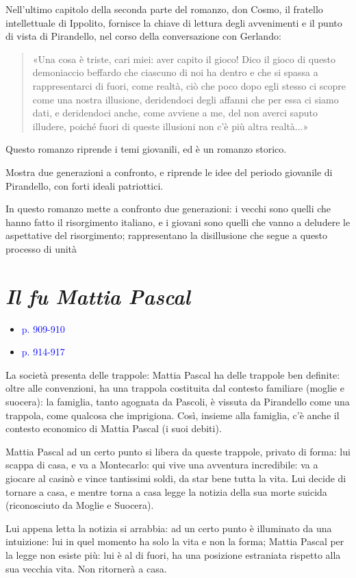 \documentclass[a4paper, twoside, titlepage]{book}
\newcommand{\elenco}[1]{%
\begin{itemize}
#1
\end{itemize}}
\newcommand{\citazione}[1]{%
  \begin{quotation}
  \noindent #1
  \end{quotation}}
\renewcommand{\emph}[1]{\textcolor{blue}{#1}}
\begin{document}
Nell'ultimo capitolo della seconda parte del romanzo, don Cosmo, il fratello intellettuale di Ippolito, fornisce la chiave di lettura degli avvenimenti e il punto di vista di Pirandello, nel corso della conversazione con Gerlando:

\citazione{«Una cosa è triste, cari miei: aver capito il gioco! Dico il gioco di questo demoniaccio beffardo che ciascuno di noi ha dentro e che si spassa a rappresentarci di fuori, come realtà, ciò che poco dopo egli stesso ci scopre come una nostra illusione, deridendoci degli affanni che per essa ci siamo dati, e deridendoci anche, come avviene a me, del non averci saputo illudere, poiché fuori di queste illusioni non c'è più altra realtà...»}

Questo romanzo riprende i temi giovanili, ed è un romanzo storico.

Mostra due generazioni a confronto, e riprende le idee del periodo giovanile di Pirandello, con forti ideali patriottici.

In questo romanzo mette a confronto due generazioni: i vecchi sono quelli che hanno fatto il risorgimento italiano, e i giovani sono quelli che vanno a deludere le aspettative del risorgimento; rappresentano la disillusione che segue a questo processo di unità


\chapter{\textit{Il fu Mattia Pascal}}
\elenco{\item \emph{p. 909-910}
\item \emph{p. 914-917}}

La società presenta delle trappole: Mattia Pascal ha delle trappole ben definite: oltre alle convenzioni, ha una trappola costituita dal contesto familiare (moglie e suocera): la famiglia, tanto agognata da Pascoli, è vissuta da Pirandello come una trappola, come qualcosa che imprigiona.
Così, insieme alla famiglia, c'è anche il contesto economico di Mattia Pascal (i suoi debiti).

Mattia Pascal ad un certo punto si libera da queste trappole, privato di forma: lui scappa di casa, e va a Montecarlo: qui vive una avventura incredibile: va a giocare al casinò e vince tantissimi soldi, da star bene tutta la vita.
Lui decide di tornare a casa, e mentre torna a casa legge la notizia della sua morte suicida (riconosciuto da Moglie e Suocera).

Lui appena letta la notizia si arrabbia: ad un certo punto è illuminato da una intuizione: lui in quel momento ha solo la vita e non la forma; Mattia Pascal per la legge non esiste più: lui è al di fuori, ha una posizione estraniata rispetto alla sua vecchia vita. Non ritornerà a casa.
\end{document}
